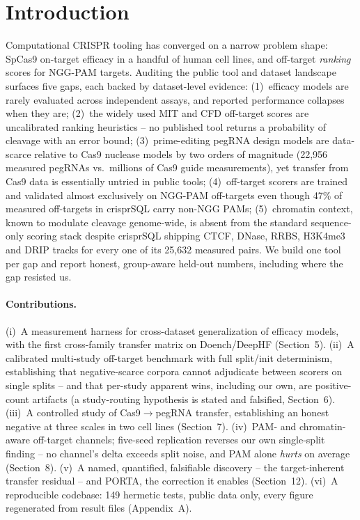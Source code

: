 \documentclass[12pt]{article}
\begin{document}
\section{Introduction}
Computational CRISPR tooling has converged on a narrow problem shape:
SpCas9 on-target efficacy in a handful of human cell lines, and off-target
\emph{ranking} scores for NGG-PAM targets. Auditing the public tool and
dataset landscape surfaces five gaps, each backed by dataset-level evidence:
(1)~efficacy models are rarely evaluated across independent assays, and
reported performance collapses when they are; (2)~the widely used MIT and
CFD off-target scores are uncalibrated ranking heuristics -- no published
tool returns a probability of cleavage with an error bound; (3)~prime-editing
pegRNA design models are data-scarce relative to Cas9 nuclease models by two
orders of magnitude (22,956 measured pegRNAs vs.\ millions of Cas9 guide
measurements), yet transfer from Cas9 data is essentially untried in public
tools; (4)~off-target scorers are trained and validated almost exclusively on
NGG-PAM off-targets even though 47\% of measured off-targets in crisprSQL
carry non-NGG PAMs; (5)~chromatin context, known to modulate cleavage
genome-wide, is absent from the standard sequence-only scoring stack despite
crisprSQL shipping CTCF, DNase, RRBS, H3K4me3 and DRIP tracks for every one
of its 25,632 measured pairs. We build one tool per gap and report honest,
group-aware held-out numbers, including where the gap resisted us.

\paragraph{Contributions.}
(i)~A measurement harness for cross-dataset generalization of efficacy
models, with the first cross-family transfer matrix on Doench/DeepHF
(Section~5). (ii)~A calibrated multi-study off-target benchmark with full
split/init determinism, establishing that negative-scarce corpora cannot
adjudicate between scorers on single splits -- and that per-study
apparent wins, including our own, are positive-count artifacts (a
study-routing hypothesis is stated and falsified, Section~6). (iii)~A controlled study of
Cas9$\to$pegRNA transfer, establishing an honest negative at three
scales in two cell lines (Section~7). (iv)~PAM- and chromatin-aware
off-target channels; five-seed replication reverses our own single-split
finding -- no channel's delta exceeds split noise, and PAM alone
\emph{hurts} on average (Section~8). (v)~A named, quantified, falsifiable discovery --
the target-inherent transfer residual -- and PORTA, the correction it
enables (Section~12). (vi)~A reproducible codebase: 149 hermetic tests,
public data only, every figure regenerated from result files (Appendix~A).
\end{document}
